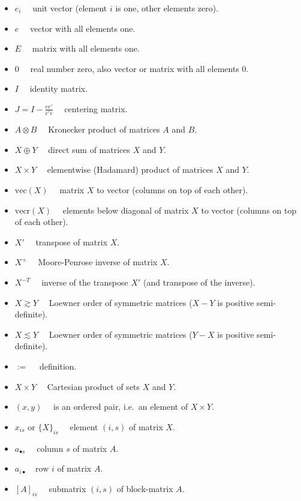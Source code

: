 \documentclass[
  12pt,
]{article}
\providecommand{\tightlist}{%
  \setlength{\itemsep}{0pt}\setlength{\parskip}{0pt}}
\begin{document}
\begin{itemize}
\tightlist
\item
  \(e_i\quad\) unit vector (element \(i\) is one, other elements zero).
\item
  \(e\quad\) vector with all elements one.
\item
  \(E\quad\) matrix with all elements one.
\item
  \(0\quad\) real number zero, also vector or matrix with all elements \(0\).
\item
  \(I\quad\) identity matrix.
\item
  \(J=I-\frac{ee'}{e'e}\quad\) centering matrix.
\item
  \(A\otimes B\quad\) Kronecker product of matrices \(A\) and \(B\).
\item
  \(X\oplus Y\quad\) direct sum of matrices \(X\) and \(Y\).
\item
  \(X\times Y\quad\) elementwise (Hadamard) product of matrices \(X\) and \(Y\).
\item
  \(\text{vec}(X)\quad\) matrix \(X\) to vector (columns on top of each other).
\item
  \(\text{vecr}(X)\quad\) elements below diagonal of matrix \(X\) to vector (columns on top of each other).
\item
  \(X'\quad\) transpose of matrix \(X\).
\item
  \(X^+\quad\) Moore-Penrose inverse of matrix \(X\).
\item
  \(X^{-T}\quad\) inverse of the transpose \(X'\) (and transpose of the inverse).
\item
  \(X\gtrsim Y\quad\) Loewner order of symmetric matrices (\(X-Y\) is positive semi-definite).
\item
  \(X\lesssim Y\quad\) Loewner order of symmetric matrices (\(Y-X\) is positive semi-definite).
\item
  \(:=\quad\) definition.
\item
  \(X\times Y\quad\) Cartesian product of sets \(X\) and \(Y\).
\item
  \((x,y)\quad\) is an ordered pair, i.e.~an element of \(X\times Y\).
\item
  \(x_{is}\) or \(\{X\}_{is}\quad\) element \((i,s)\) of matrix \(X\).
\item
  \(a_{\bullet s}\quad\) column \(s\) of matrix \(A\).
\item
  \(a_{i\bullet\quad}\) row \(i\) of matrix \(A\).
\item
  \([A]_{is}\quad\) submatrix \((i,s)\) of block-matrix \(A\).

\end{itemize}
\end{document}
